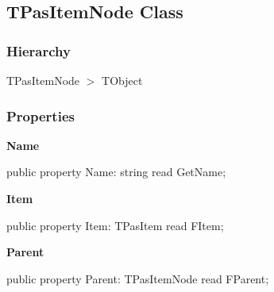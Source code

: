 \documentclass{report}
\newif\ifpdf
\begin{document}
\subsection*{TPasItemNode Class}
\fi
\label{PasDoc_HierarchyTree.TPasItemNode}
\subsubsection*{\large{\textbf{Hierarchy}}\normalsize\hspace{1ex}\hfill}
TPasItemNode {$>$} TObject
\subsubsection*{\large{\textbf{Properties}}\normalsize\hspace{1ex}\hfill}
\begin{list}{}{
\setlength{\itemindent}{0cm}
\setlength{\listparindent}{0cm}
\setlength{\leftmargin}{\evensidemargin}
\addtolength{\leftmargin}{\tmplength}
\settowidth{\labelsep}{X}
\addtolength{\leftmargin}{\labelsep}
\setlength{\labelwidth}{\tmplength}
}
\label{PasDoc_HierarchyTree.TPasItemNode-Name}
\item[\textbf{Name}\hfill]
\ifpdf
\begin{flushleft}
\fi
\begin{ttfamily}
public property Name: string read GetName;\end{ttfamily}

\ifpdf
\end{flushleft}
\fi


\par  \label{PasDoc_HierarchyTree.TPasItemNode-Item}
\item[\textbf{Item}\hfill]
\ifpdf
\begin{flushleft}
\fi
\begin{ttfamily}
public property Item: TPasItem read FItem;\end{ttfamily}

\ifpdf
\end{flushleft}
\fi


\par  \label{PasDoc_HierarchyTree.TPasItemNode-Parent}
\item[\textbf{Parent}\hfill]
\ifpdf
\begin{flushleft}
\fi
\begin{ttfamily}
public property Parent: TPasItemNode read FParent;\end{ttfamily}

\ifpdf
\end{flushleft}
\fi


\par  \end{list}
\end{document}
